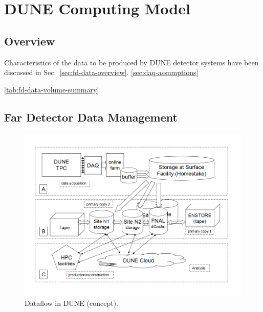 \section{DUNE Computing Model}
\label{sec:computing_model}

\subsection{Overview}
Characteristics of the data to be produced by DUNE detector systems have been discussed in Sec.~\ref{sec:fd-data-overview}.
\ref{sec:daq-assumptions}

\ref{tab:fd-data-volume-summary}

\subsection{Far Detector Data Management}

\begin{figure}[h!]
\centering
\includegraphics[width=\textwidth]{DUNEdataflow.png}
\caption{Dataflow in DUNE (concept).}
\label{fig:DUNEdataflow}
\end{figure}